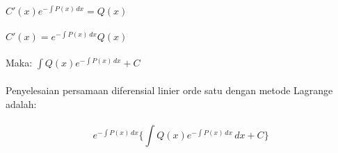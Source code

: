 \begin{enumerate}[1.]
	\begin{math} C'(x)e^{- \int P(x) \, dx} = Q(x) \end{math} \\ \\
	\begin{math} C'(x) = e^{- \int P(x) \, dx}Q(x) \end{math} \\ \\
	Maka:
	\begin{math} \int Q(x)e^{- \int P(x) \, dx} + C \end{math} \\ \\
	Penyelesaian persamaan diferensial linier orde satu dengan metode Lagrange adalah: \\ \\
	\begin{equation} e^{- \int P(x) \, dx} \bigg\{ \int Q(x)e^{- \int P(x) \, dx}  \, dx + C \bigg\} \end{equation}


\end{enumerate}
